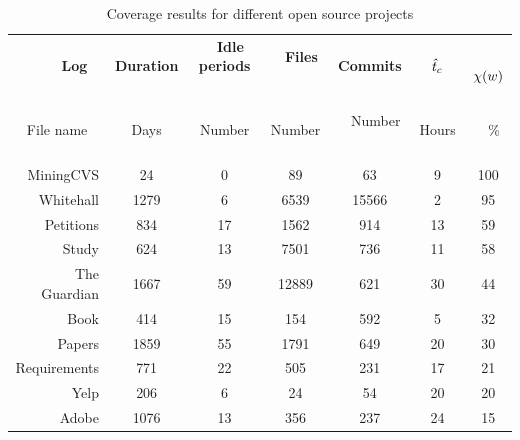 \begin{table}
\caption{Coverage results for different open source projects}
\label{tab:experiments}
\centering
\begin{tabular}{rcccccc}
\hline\noalign{\smallskip}
\textbf{Log} ~&~ \textbf{Duration} ~&~ \textbf{Idle periods} ~&~ \textbf{Files} ~&~	 \textbf{Commits} ~&~	\textbf{$\mathit{\hat{t}_{c}}$} ~&~ \textbf{$\chi(w)$}\\
File name ~&~ Days ~&~ Number ~&~ Number ~&~ Number ~&~ Hours ~&~ \% \\
\hline \hline
\noalign{\medskip}
MiningCVS &	24 & 0 & 89  &	 63 & 9 & 100 \\

Whitehall & 1279 & 6 & 6539  &	15566 & 2 & 95 \\

Petitions &	834 & 17 & 1562  &	914 & 13 & 59 \\

Study &	624 & 13 & 7501  &	736 & 11 & 58 \\

The Guardian &	1667 & 59 & 12889  &	 621 & 30 & 44 \\

Book &	414 & 15 & 154  & 592 & 5 & 32 \\

Papers &	 1859 & 55 & 1791  &	 649 & 20 & 30 \\

Requirements & 771 & 22 & 505  &	231 & 17 & 21 \\

Yelp &	206 & 6 & 24  &	54 & 20 & 20 \\

Adobe &	1076 & 13 & 356  &	237 & 24 & 15 \\

\hline
\end{tabular}%
\end{table}

